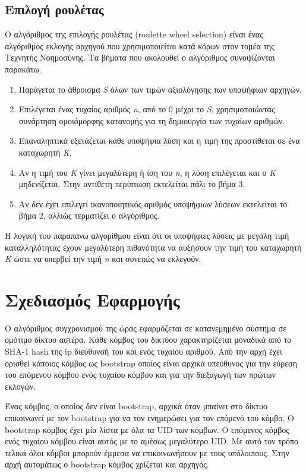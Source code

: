 \documentclass{article}
\begin{document}
\subsection{Επιλογή ρουλέτας}
Ο αλγόριθμος της επιλογής ρουλέτας (roulette wheel selection) είναι ένας
αλγόριθμος εκλογής αρχηγού που χρησιμοποιείται κατά κόρων στον τομέα της
Τεχνητής Νοημοσύνης. Τα βήματα που ακολουθεί ο αλγόριθμος συνοψίζονται παρακάτω.
\begin{enumerate}
    \item Παράγεται το άθροισμα \emph{S} όλων των τιμών αξιολόγησης των
υποψήφιων αρχηγών.
    \item Επιλέγεται ένας τυχαίος αριθμός \emph{n}, από το 0 μέχρι το \emph{S},
χρησιμοποιώντας συνάρτηση ομοιόμορφης κατανομής για τη δημιουργία των τυχαίων
αριθμών.
    \item Επαναληπτικά εξετάζεται κάθε υποψήφια λύση και η τιμή της προστίθεται
σε ένα καταχωρητή \emph{K}.
    \item Αν η τιμή του \emph{K} γίνει μεγαλύτερη ή ίση του \emph{n}, η λύση
επιλέγεται και ο \emph{K} μηδενίζεται. Στην αντίθετη περίπτωση εκτελείται πάλι
το βήμα 3.
    \item Αν δεν έχει επιλεγεί ικανοποιητικός αριθμός υποψήφιων λύσεων
εκτελείται το βήμα 2, αλλιώς τερματίζει ο αλγόριθμος.
\end{enumerate}

Η λογική του παραπάνω αλγορίθμου είναι ότι οι υποψήφιες λύσεις με μεγάλη τιμή
καταλληλότητας έχουν μεγαλύτερη πιθανότητα να αυξήσουν την τιμή του καταχωρητή
\emph{K} ώστε να υπερβεί την τιμή \emph{n} και συνεπώς να εκλεγούν.

\section{Σχεδιασμός Εφαρμογής}
Ο αλγόριθμος συγχρονισμού της ώρας εφαρμόζεται σε κατανεμημένο σύστημα σε
ομότιμο δίκτυο αστέρα. Κάθε κόμβος του δικτύου χαρακτηρίζεται μοναδικά από 
το SHA-1 hash της ip διεύθυνσή του και ενός τυχαίου αριθμού. Από την αρχή έχει
ορισθεί κάποιος κόμβος ως bootstrap οποίος είναι αρχικά υπεύθυνος για την
εύρεση του επόμενου κόμβου ενός τυχαίου κόμβου και για την διεξαγωγή των πρώτων
εκλογών.

Ένας κόμβος, ο οποίος δεν είναι bootstrap, αρχικά όταν μπαίνει στο δίκτυο
επικοινωνεί με τον bootstrap για να τον ενημερώσει για τον επόμενό του κόμβο. Ο
bootstrap κόμβος έχει μία λίστα με όλα τα UID των κόμβων. Ο επόμενος κόμβος ενός
τυχαίου κόμβου είναι αυτός με το αμέσως μεγαλύτερο UID. Με αυτό τον τρόπο τελικά
όλοι κόμβοι μπορούν έμμεσα να επικοινωνήσουν με τους υπόλοιπους. Στην αρχή
αυτομάτως ο bootstrap κόμβος χρίζεται και αρχηγός.
\end{document}
